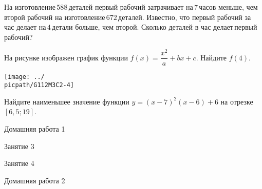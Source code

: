 \begin{class}[number=2]
\begin{listofex}
		\item На изготовление \( 588 \) деталей первый рабочий затрачивает на \( 7 \) часов меньше, чем второй рабочий на изготовление \( 672 \) деталей. Известно, что первый рабочий за час делает на \( 4 \) детали больше, чем второй. Сколько деталей в час делает первый рабочий?
		\item
		\begin{minipage}[t]{\bodywidth}
			На рисунке изображен график функции \( f(x)=\dfrac{x^2}{a}+bx+c \). Найдите \( f(4) \).
		\end{minipage}
		\begin{minipage}[t]{\picwidth}
			\texttt{[image: ../\\picpath/G112M3C2-4]}
		\end{minipage}
		\item Найдите наименьшее значение функции \( y=(x-7)^2(x-6)+6 \) на отрезке \( [6,5;19] \).
	\end{listofex}
\end{class}

\begin{homework}[number=1]
	\begin{listofex}
		\item Домашняя работа 1
	\end{listofex}
\end{homework}

\begin{class}[number=3]
	\begin{listofex}
		\item Занятие 3 
	\end{listofex}
\end{class}

\begin{class}[number=4]
	\begin{listofex}
		\item Занятие 4
	\end{listofex}
\end{class}

\begin{homework}[number=2]
	\begin{listofex}
		\item Домашняя работа 2
	\end{listofex}
\end{homework}

